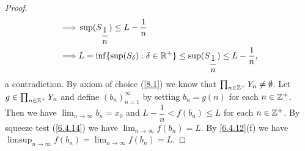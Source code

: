 \begin{proof}
\begin{align*}
    \implies & \sup(S_{\dfrac{1}{n}}) \leq L - \dfrac{1}{n}                                                      \\
    \implies & L = \inf\{\sup(S_{\delta}) : \delta \in \mathbb{R}^+\} \leq \sup(S_{\dfrac{1}{n}}) \leq L - \dfrac{1}{n},
  \end{align*}
  a contradiction.
  By axiom of choice (\cref{8.1}) we know that \(\prod_{n \in \mathbb{Z}^+} Y_n \neq \emptyset\).
  Let \(g \in \prod_{n \in \mathbb{Z}^+} Y_n\) and define \((b_n)_{n = 1}^\infty\) by setting \(b_n = g(n)\) for each \(n \in \mathbb{Z}^+\).
  Then we have \(\lim_{n \to \infty} b_n = x_0\) and \(L - \dfrac{1}{n} < f(b_n) \leq L\) for each \(n \in \mathbb{Z}^+\).
  By squeeze test (\cref{6.4.14}) we have \(\lim_{n \to \infty} f(b_n) = L\).
  By \cref{6.4.12}(f) we have \(\limsup_{n \to \infty} f(b_n) = \lim_{n \to \infty} f(b_n) = L\).


\end{proof}
